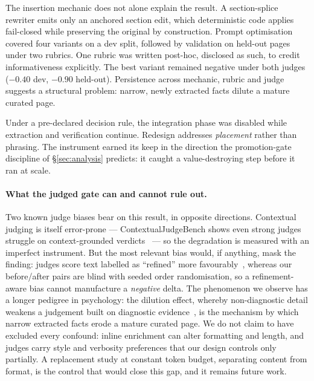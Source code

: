 \documentclass[10pt,twocolumn]{article}
\begin{document}
The insertion mechanic does not alone explain the result. A section-splice rewriter emits only
an anchored section edit, which deterministic code applies fail-closed while preserving the
original by construction. Prompt optimisation covered four variants on a dev split, followed
by validation on held-out pages under two rubrics. One rubric was written post-hoc, disclosed
as such, to credit informativeness explicitly. The best variant remained negative under both
judges ($-0.40$ dev, $-0.90$ held-out). Persistence across mechanic, rubric and judge suggests
a structural problem: narrow, newly extracted facts dilute a mature curated page.

Under a pre-declared decision rule, the integration phase was disabled while extraction and
verification continue. Redesign addresses \emph{placement} rather than phrasing. The
instrument earned its keep in the direction the promotion-gate discipline
of \S\ref{sec:analysis} predicts: it caught a value-destroying step before it ran at scale.

\paragraph{What the judged gate can and cannot rule out.} Two known judge biases bear on this result, in opposite directions. Contextual judging is itself error-prone --- ContextualJudgeBench shows even strong judges struggle on context-grounded verdicts~\cite{contextualjudgebench2025} --- so the degradation is measured with an imperfect instrument. But the most relevant bias would, if anything, mask the finding: judges score text labelled as ``refined'' more favourably~\cite{calmjudgebias2024}, whereas our before/after pairs are blind with seeded order randomisation, so a refinement-aware bias cannot manufacture a \emph{negative} delta. The phenomenon we observe has a longer pedigree in psychology: the dilution effect, whereby non-diagnostic detail weakens a judgement built on diagnostic evidence~\cite{nisbett1981dilution}, is the mechanism by which narrow extracted facts erode a mature curated page. We do not claim to have excluded every confound: inline enrichment can alter formatting and length, and judges carry style and verbosity preferences that our design controls only partially. A replacement study at constant token budget, separating content from format, is the control that would close this gap, and it remains future work.
\end{document}
